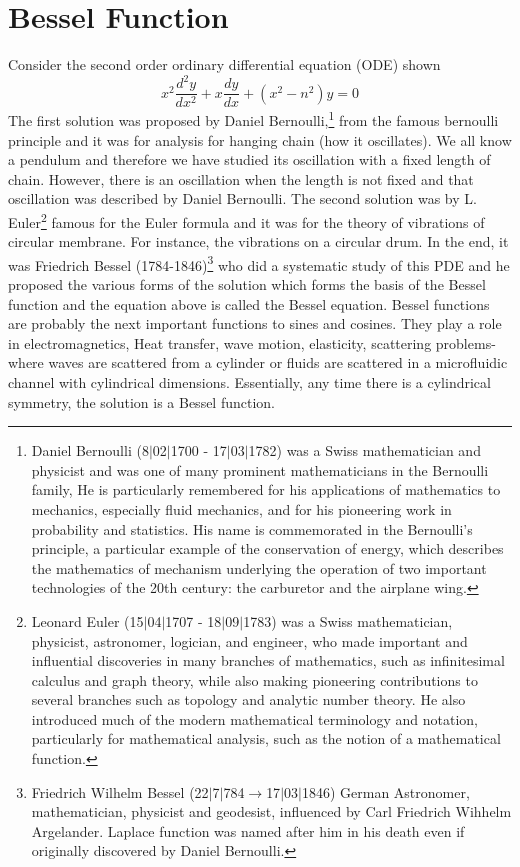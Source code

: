 \section{Bessel Function}
Consider the second order ordinary differential equation (ODE) shown $$x^2 \frac{d^2 y}{dx^2} + x \frac{dy}{dx} + (x^2 - n^2)y = 0$$
The first solution was proposed by Daniel Bernoulli,\footnote{Daniel Bernoulli (8$|$02$|$1700 - 17$|$03$|$1782) was a Swiss mathematician and physicist and was one of many prominent mathematicians in the Bernoulli family, He is particularly remembered for his applications of mathematics to mechanics, especially fluid mechanics, and for his pioneering work in probability and statistics. His name is commemorated in the Bernoulli's principle, a particular example of the conservation of energy, which describes the mathematics of mechanism underlying the operation of two important technologies of the 20th century: the carburetor and the airplane wing.}
from the famous bernoulli principle and it was for analysis for hanging chain (how it oscillates). We all know a pendulum and therefore we have studied its oscillation with a fixed length of chain. However, there is an oscillation when the length is not fixed and that oscillation was described by Daniel Bernoulli. The second solution was by L. Euler\footnote{Leonard Euler (15$|$04$|$1707 - 18$|$09$|$1783) was a Swiss mathematician, physicist, astronomer, logician, and engineer, who made important and influential discoveries in many branches of mathematics, such as infinitesimal calculus and graph theory, while also making pioneering contributions to several branches such as topology and analytic number theory. He also introduced much of the modern mathematical terminology and notation, particularly for mathematical analysis, such as the notion of a mathematical function.} famous for the Euler formula and it was for the theory of vibrations of circular membrane. For instance, the vibrations on a circular drum. In the end, it was Friedrich Bessel (1784-1846)\footnote{Friedrich Wilhelm Bessel (22$|$7$|$784$\rightarrow$17$|$03$|$1846) German Astronomer, mathematician, physicist and geodesist, influenced by Carl Friedrich Wihhelm Argelander. Laplace function was named after him in his death even if originally discovered by Daniel Bernoulli.} who did a systematic study of this PDE and he proposed the various forms of the solution which forms the basis of the Bessel function and the equation above is called the Bessel equation. Bessel functions are probably the next important functions to sines and cosines. They play a role in electromagnetics, Heat transfer, wave motion, elasticity, scattering problems- where waves are scattered from a cylinder or fluids are scattered in a microfluidic channel with cylindrical dimensions. Essentially, any time there is a cylindrical symmetry, the solution is a Bessel function.

